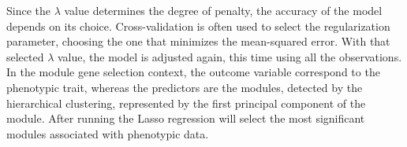 \documentclass[12pt,journal, onecolumn]{IEEEtran}
\begin{document}


Since the $\lambda$ value determines the degree of penalty, the accuracy of the model depends on its choice. Cross-validation is often used to select the regularization parameter, choosing the one that minimizes the mean-squared error. With that selected $\lambda$ value, the model is adjusted again, this time using all the observations.\\

In the module gene selection context, the outcome variable correspond to the phenotypic trait, whereas the predictors are the modules, detected by the hierarchical clustering, represented by the first principal component of the module. After running the Lasso regression will select the most significant modules associated with phenotypic data.  
\end{document}
